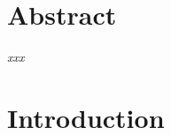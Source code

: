 \documentclass[11pt]{article}
\newenvironment{myabstract}{\clearpage\section*{Abstract}}{\clearpage}
\newenvironment{mysignificance}{\clearpage\section*{Significance}}{\clearpage}
\begin{document}


\baselineskip22pt
\linenumbers

\setcounter{page}{1}

\begin{myabstract}
	
	\lipsum[66]
	
\vspace{3em}		

	\noindent{} 
		\emph{
			xxx
		}
\end{myabstract}



%	
%	



\baselineskip30pt


\section{Introduction}






\end{document}
